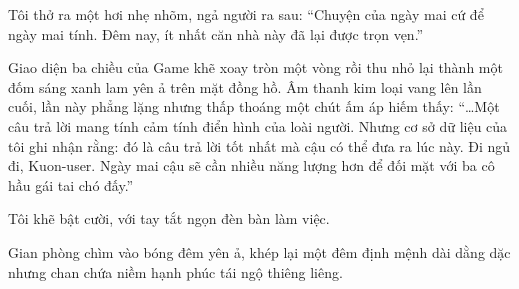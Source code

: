 \documentclass[../main.tex]{subfiles}
\begin{document}
Tôi thở ra một hơi nhẹ nhõm, ngả người ra sau: ``Chuyện của ngày mai cứ để ngày mai tính. Đêm nay, ít nhất căn nhà này đã lại được trọn vẹn.''

Giao diện ba chiều của Game khẽ xoay tròn một vòng rồi thu nhỏ lại thành một đốm sáng xanh lam yên ả trên mặt đồng hồ. Âm thanh kim loại vang lên lần cuối, lần này phẳng lặng nhưng thấp thoáng một chút ấm áp hiếm thấy: ``\dots Một câu trả lời mang tính cảm tính điển hình của loài người. Nhưng cơ sở dữ liệu của tôi ghi nhận rằng: đó là câu trả lời tốt nhất mà cậu có thể đưa ra lúc này. Đi ngủ đi, Kuon-user. Ngày mai cậu sẽ cần nhiều năng lượng hơn để đối mặt với ba cô hầu gái tai chó đấy.''

Tôi khẽ bật cười, với tay tắt ngọn đèn bàn làm việc.

Gian phòng chìm vào bóng đêm yên ả, khép lại một đêm định mệnh dài dằng dặc nhưng chan chứa niềm hạnh phúc tái ngộ thiêng liêng.
\end{document}
